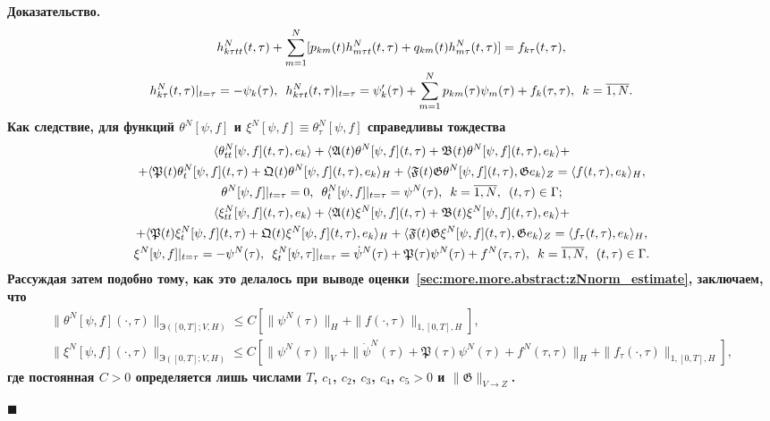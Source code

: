 \documentclass{report}
\newenvironment{Proof}{\par\noindent\bf Доказательство.\rm}{ $\blacksquare$\par}
\begin{document}
\begin{Proof}
\begin{gather}\label{hN_tau_kttau_Cauchy:theta}
h^N_{k\tau tt}(t,\tau)+\sum\limits_{m=1}^N[p_{km}(t)h^N_{m\tau t}(t,\tau)+q_{km}(t)h^N_{m\tau}(t,\tau)]=f_{k\tau}(t,\tau),\\
\notag h^N_{k\tau}(t,\tau)|_{t=\tau}=-\psi_k(\tau),\,\,\,h^N_{k\tau t}(t,\tau)|_{t=\tau}=\psi_k'(\tau)+\sum\limits_{m=1}^Np_{km}(\tau)\psi_m(\tau)+ f_k(\tau,\tau),\,\,\,k=\overline{1,N}.
\end{gather}
Как следствие, для функций $\theta^N[\psi,f]$ и $\xi^N[\psi,f]\equiv\theta^N_\tau[\psi,f]$ справедливы тождества
\begin{gather}
\label{thetaN_identity:nonaut:parametric:non-homo}
\langle\theta^{N}_{tt}[\psi,f](t,\tau),e_k\rangle + \langle\mathfrak{A}(t)\theta^{N}[\psi,f](t,\tau)+\mathfrak{B}(t)\theta^{N}[\psi,f](t,\tau),e_k\rangle+\\
\notag+\langle \mathfrak{P}(t)\theta^{N}_t[\psi,f](t,\tau)+\mathfrak{Q}(t)\theta^{N}[\psi,f](t,\tau),e_k\rangle_H+\langle\mathfrak{F}(t) \mathfrak{G}\theta^{N}[\psi,f](t,\tau), \mathfrak{G}e_k\rangle_Z=\langle f(t,\tau),e_k\rangle_H,\\
\notag\theta^{N}[\psi,f]|_{t=\tau}=0,\,\,\,\theta^{N}_t[\psi,f]|_{t=\tau}=\psi^{N}(\tau),\,\,\,k=\overline{1,N},\,\,\,(t,\tau)\in\Gamma;\\
\label{xiN_identity:nonaut:parametric:non-homo}
\langle\xi^{N}_{tt}[\psi,f](t,\tau),e_k\rangle + \langle\mathfrak{A}(t)\xi^{N}[\psi,f](t,\tau)+\mathfrak{B}(t)\xi^{N}[\psi,f](t,\tau),e_k\rangle+\\
\notag+\langle \mathfrak{P}(t)\xi^{N}_t[\psi,f](t,\tau)+\mathfrak{Q}(t)\xi^{N}[\psi,f](t,\tau),e_k\rangle_H+\langle\mathfrak{F}(t) \mathfrak{G}\xi^{N}[\psi,f](t,\tau), \mathfrak{G}e_k\rangle_Z=\langle f_\tau(t,\tau),e_k\rangle_H,\\
\notag\xi^N[\psi,f]|_{t=\tau}=-\psi^N(\tau),\,\,\,\xi^N_t[\psi,\tau]|_{t=\tau}=\dot{\psi}^N(\tau)+\mathfrak{P}(\tau)\psi^N(\tau)+f^N(\tau,\tau),\,\,\,k=\overline{1,N},\,\,\,(t,\tau)\in\Gamma.
\end{gather}
Рассуждая затем подобно тому, как это делалось при выводе оценки~\eqref{sec:more.more.abstract:zNnorm_estimate}, заключаем, что
\begin{gather*}
\|\theta^{N}[\psi,f](\cdot,\tau)\|_{\textrm{Э}([0,T]; V,H)}\leqslant C[\|\psi^N(\tau)\|_H+\|f(\cdot,\tau)\|_{1,[0,T],H}],\\
\|\xi^N[\psi,f](\cdot,\tau)\|_{\textrm{Э}([0,T]; V,H)}\leqslant C[\|\psi^N(\tau)\|_V+\|\dot{\psi}^N(\tau)+\mathfrak{P}(\tau)\psi^N(\tau)+f^N(\tau,\tau)\|_H+\|f_\tau(\cdot,\tau)\|_{1,[0,T],H}],
\end{gather*}
где постоянная $C>0$ определяется лишь числами $T$, $c_1$, $c_2$, $c_3$, $c_4$, $c_5>0$ и $\|\mathfrak{G}\|_{V\to Z}$.


\end{Proof}
\end{document}
